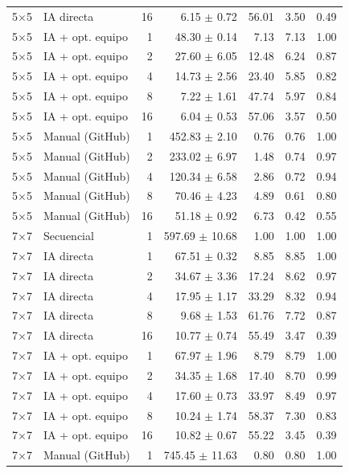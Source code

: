 \begin{tabular}{llrrrrr}
5$\times$5 & IA directa & 16 & 6.15 $\pm$ 0.72 & 56.01 & 3.50 & 0.49 \\
5$\times$5 & IA + opt. equipo & 1 & 48.30 $\pm$ 0.14 & 7.13 & 7.13 & 1.00 \\
5$\times$5 & IA + opt. equipo & 2 & 27.60 $\pm$ 6.05 & 12.48 & 6.24 & 0.87 \\
5$\times$5 & IA + opt. equipo & 4 & 14.73 $\pm$ 2.56 & 23.40 & 5.85 & 0.82 \\
5$\times$5 & IA + opt. equipo & 8 & 7.22 $\pm$ 1.61 & 47.74 & 5.97 & 0.84 \\
5$\times$5 & IA + opt. equipo & 16 & 6.04 $\pm$ 0.53 & 57.06 & 3.57 & 0.50 \\
5$\times$5 & Manual (GitHub) & 1 & 452.83 $\pm$ 2.10 & 0.76 & 0.76 & 1.00 \\
5$\times$5 & Manual (GitHub) & 2 & 233.02 $\pm$ 6.97 & 1.48 & 0.74 & 0.97 \\
5$\times$5 & Manual (GitHub) & 4 & 120.34 $\pm$ 6.58 & 2.86 & 0.72 & 0.94 \\
5$\times$5 & Manual (GitHub) & 8 & 70.46 $\pm$ 4.23 & 4.89 & 0.61 & 0.80 \\
5$\times$5 & Manual (GitHub) & 16 & 51.18 $\pm$ 0.92 & 6.73 & 0.42 & 0.55 \\
\midrule
7$\times$7 & Secuencial & 1 & 597.69 $\pm$ 10.68 & 1.00 & 1.00 & 1.00 \\
7$\times$7 & IA directa & 1 & 67.51 $\pm$ 0.32 & 8.85 & 8.85 & 1.00 \\
7$\times$7 & IA directa & 2 & 34.67 $\pm$ 3.36 & 17.24 & 8.62 & 0.97 \\
7$\times$7 & IA directa & 4 & 17.95 $\pm$ 1.17 & 33.29 & 8.32 & 0.94 \\
7$\times$7 & IA directa & 8 & 9.68 $\pm$ 1.53 & 61.76 & 7.72 & 0.87 \\
7$\times$7 & IA directa & 16 & 10.77 $\pm$ 0.74 & 55.49 & 3.47 & 0.39 \\
7$\times$7 & IA + opt. equipo & 1 & 67.97 $\pm$ 1.96 & 8.79 & 8.79 & 1.00 \\
7$\times$7 & IA + opt. equipo & 2 & 34.35 $\pm$ 1.68 & 17.40 & 8.70 & 0.99 \\
7$\times$7 & IA + opt. equipo & 4 & 17.60 $\pm$ 0.73 & 33.97 & 8.49 & 0.97 \\
7$\times$7 & IA + opt. equipo & 8 & 10.24 $\pm$ 1.74 & 58.37 & 7.30 & 0.83 \\
7$\times$7 & IA + opt. equipo & 16 & 10.82 $\pm$ 0.67 & 55.22 & 3.45 & 0.39 \\
7$\times$7 & Manual (GitHub) & 1 & 745.45 $\pm$ 11.63 & 0.80 & 0.80 & 1.00 \\

\end{tabular}
